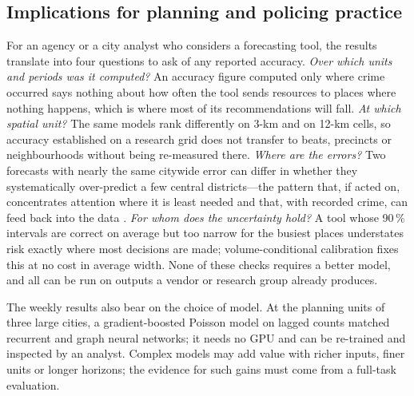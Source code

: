 \documentclass[preprint,12pt,authoryear]{elsarticle}
\begin{document}
\subsection{Implications for planning and policing practice}
For an agency or a city analyst who considers a forecasting tool, the results translate into four questions to ask of any reported accuracy. \emph{Over which units and periods was it computed?} An accuracy figure computed only where crime occurred says nothing about how often the tool sends resources to places where nothing happens, which is where most of its recommendations will fall. \emph{At which spatial unit?} The same models rank differently on 3-km and on 12-km cells, so accuracy established on a research grid does not transfer to beats, precincts or neighbourhoods without being re-measured there. \emph{Where are the errors?} Two forecasts with nearly the same citywide error can differ in whether they systematically over-predict a few central districts---the pattern that, if acted on, concentrates attention where it is least needed and that, with recorded crime, can feed back into the data \citep{ensign2018runaway}. \emph{For whom does the uncertainty hold?} A tool whose 90\,\% intervals are correct on average but too narrow for the busiest places understates risk exactly where most decisions are made; volume-conditional calibration fixes this at no cost in average width. None of these checks requires a better model, and all can be run on outputs a vendor or research group already produces.

The weekly results also bear on the choice of model. At the planning units of three large cities, a gradient-boosted Poisson model on lagged counts matched recurrent and graph neural networks; it needs no GPU and can be re-trained and inspected by an analyst. Complex models may add value with richer inputs, finer units or longer horizons; the evidence for such gains must come from a full-task evaluation.
\end{document}
